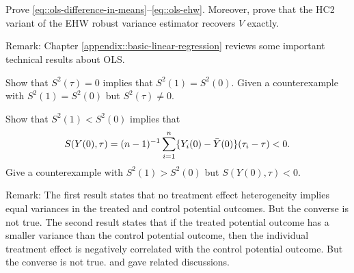 \begin{HomeworkProblem}\label{exr:4-3}


Prove \eqref{eq::ols-difference-in-means}--\eqref{eq::ols-ehw}. Moreover, prove that the HC2 variant of the EHW robust variance estimator recovers $\hat{V}$ exactly.

Remark: Chapter \ref{appendix::basic-linear-regression} reviews some important technical results about OLS.





\end{HomeworkProblem}

\begin{HomeworkProblem}\label{exr:4-4}


Show that $S^2(\tau) = 0$ implies that $S^2(1) = S^2(0)$. Given a counterexample with $S^2(1) = S^2(0)$ but $S^2(\tau) \neq  0$.


Show that $S^2(1) < S^2(0)$ implies that
\[
S(Y(0),\tau)  = (n-1)^{-1} \sum_{i=1}^n \{ Y_i(0)  - \bar{Y}(0) \} (\tau_i - \tau) <0.
\]
Give a counterexample with $S^2(1) > S^2(0)$ but $S(Y(0),\tau)  < 0 .$



Remark: The first result states that no treatment effect heterogeneity implies equal variances in the treated and control potential outcomes. But the converse is not true. The second result states that if the treated potential outcome has a smaller variance than the control potential outcome, then the individual treatment effect is negatively correlated with the control potential outcome. But the converse is not true. \citet[][page 293]{gerber2012field} and \citet[][Appendix B.3]{ding2019decomposing} gave related discussions.



\end{HomeworkProblem}

